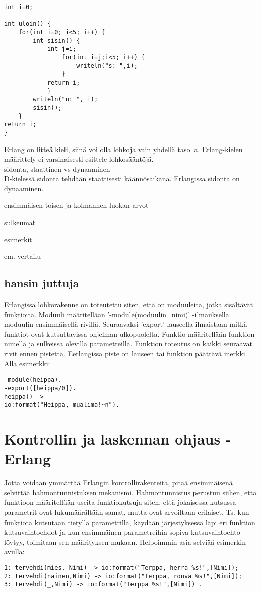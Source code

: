 \documentclass[11pt,oneside,a4paper]{article}
\begin{document}
\begin{verbatim}
int i=0;

int uloin() {
    for(int i=0; i<5; i++) {
        int sisin() {
            int j=i;
                for(int i=j;i<5; i++) {
                    writeln("s: ",i);
                }
            return i;
            }
        writeln("u: ", i);
        sisin();
    }
return i;
}
\end{verbatim}

Erlang on litteä kieli, siinä voi olla lohkoja vain yhdellä tasolla.
Erlang-kielen määrittely ei varsinaisesti esittele lohkosääntöjä. \\

sidonta, staattinen vs dynaaminen \\
D-kielessä sidonta tehdään staattisesti käännösaikana. Erlangissa sidonta on
dynaaminen.

ensimmäisen toisen ja kolmannen luokan arvot

sulkeumat

esimerkit

em. vertailu
\subsection{hansin juttuja}
Erlangissa lohkorakenne on toteutettu siten, että on moduuleita, jotka sisältävät funktioita. Moduuli määritellään '-module(moduulin_nimi)' -ilmauksella moduulin ensimmäisellä rivillä.
Seuraavaksi 'export'-lauseella ilmaistaan mitkä funktiot ovat kutsuttavissa ohjelman ulkopuolelta. Funktio määritellään funktion nimellä ja sulkeissa olevilla parametreilla. Funktion toteutus
on kaikki seuraavat rivit ennen pistettä. Eerlangissa piste on lauseen tai funktion päättävä merkki. Alla esimerkki:
\begin{verbatim}
-module(heippa).
-export([heippa/0]).
heippa() ->
io:format("Heippa, mualima!~n").
\end{verbatim}


\section{Kontrollin ja laskennan ohjaus - Erlang}
Jotta voidaan ymmärtää Erlangin kontrollirakenteita, pitää ensimmäisenä
selvittää hahmontunnistuksen mekanismi. Hahmontunnistus perustuu siihen, että
funktioon määritellään useita funktiokutsuja siten, että jokaisessa kutsussa
parametrit ovat lukumäärältään samat, mutta ovat arvoiltaan erilaiset. Ts. kun 
funktiota kutsutaan tietyllä parametrilla, käydään järjestyksessä läpi eri
funktion kutsuvaihtoehdot ja kun ensimmäinen parametreihin sopiva
kutsuvaihtoehto löytyy, 
toimitaan sen määrityksen mukaan. Helpoimmin asia selviää esimerkin avulla: 
\begin{verbatim}
1: tervehdi(mies, Nimi) -> io:format("Terppa, herra %s!",[Nimi]);
2: tervehdi(nainen,Nimi) -> io:format("Terppa, rouva %s!",[Nimi]);
3: tervehdi(_,Nimi) -> io:format("Terppa %s!",[Nimi]) . 
\end{verbatim}
\end{document}
